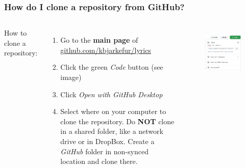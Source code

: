 \documentclass[aspectratio=169]{beamer} %
\newcommand{\trainingURL}[1]{{\color{blue}\url{#1}}}
\newcommand{\traininerUsername}{kbjarkefur}
\newcommand{\repoName}{\traininerUsername/lyrics}
\newcommand{\trainingRepoURL}[1]{\trainingURL{github.com/\repoName #1}}
\begin{document}
\begin{frame}
\frametitle{How do I clone a repository from GitHub?}

	\begin{columns}[c]

		How to clone a repository:
		\begin{enumerate}
			\item Go to the \textbf{main page} of \trainingRepoURL{}
			\item Click the green \textit{Code} button (see image)
			\item Click \textit{Open with GitHub Desktop}
			\item Select where on your computer to clone the repository. Do \textbf{NOT} clone in a shared folder, like a network drive or in DropBox. Create a \textit{GitHub} folder in non-synced location and clone there. 
		\end{enumerate}

		\begin{figure}
			\centering
			\includegraphics[width=1\linewidth]{img/clonedownload_button}
			\label{fig:clonedownloadbutton}
		\end{figure}

	\end{columns}

\end{frame}
\end{document}
